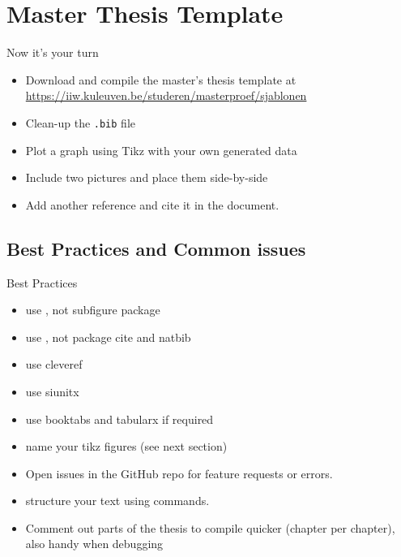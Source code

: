 \section{Master Thesis Template}



\begin{frame}[fragile]{Now it's your turn}
\vspace{.5cm}

\begin{itemize}
	\item Download and compile the master's thesis template at 
\href{https://iiw.kuleuven.be/studeren/masterproef/sjablonen}{https://iiw.kuleuven.be/studeren/masterproef/sjablonen}
\item Clean-up the \texttt{.bib} file
\item Plot a graph using Tikz with your own generated data
\item Include two pictures and place them side-by-side
\item Add another reference and cite it in the document.
\end{itemize}
\end{frame}

\subsection{Best Practices and Common issues}
\begin{frame}[fragile]{Best Practices}
\begin{itemize}
    \item use , not subfigure package 
    \item use , not package cite and natbib
    \item use cleveref
    \item use siunitx
    \item use booktabs and tabularx if required
    \item name your tikz figures (see next section)
    \item Open issues in the GitHub repo for feature requests or errors.
    \item structure your text using \verb|| commands.
    \item Comment out parts of the thesis to compile quicker (chapter per chapter), also handy when debugging
\end{itemize}    
\end{frame}

